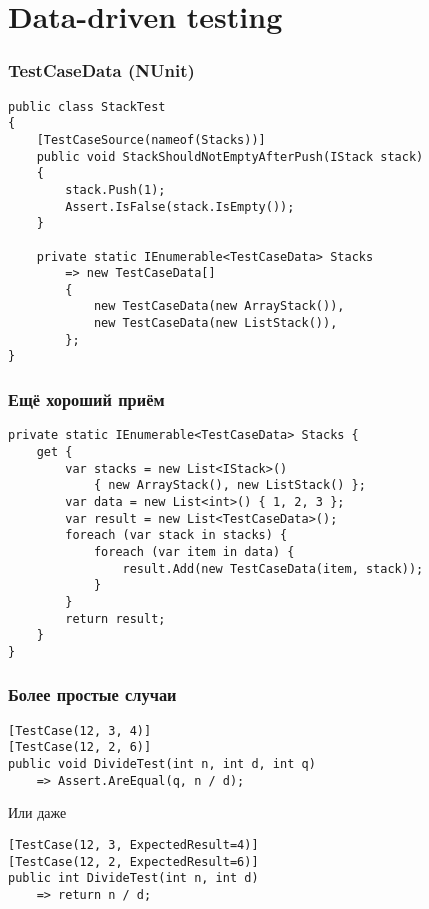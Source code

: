 \documentclass{../../slides-style}
\begin{document}
    \begin{frame}[plain]
        \titlepage
    \end{frame}

    \section{Data-driven testing}

    \begin{frame}[fragile]
        \frametitle{TestCaseData (NUnit)}
        \begin{verbatim}
public class StackTest
{
    [TestCaseSource(nameof(Stacks))]
    public void StackShouldNotEmptyAfterPush(IStack stack)
    {
        stack.Push(1);
        Assert.IsFalse(stack.IsEmpty());
    }

    private static IEnumerable<TestCaseData> Stacks
        => new TestCaseData[]
        {
            new TestCaseData(new ArrayStack()),
            new TestCaseData(new ListStack()),
        };
}
        \end{verbatim}
    \end{frame}

    \begin{frame}[fragile]
        \frametitle{Ещё хороший приём}
        \begin{verbatim}
private static IEnumerable<TestCaseData> Stacks { 
    get {
        var stacks = new List<IStack>() 
            { new ArrayStack(), new ListStack() };
        var data = new List<int>() { 1, 2, 3 };
        var result = new List<TestCaseData>();
        foreach (var stack in stacks) {
            foreach (var item in data) {
                result.Add(new TestCaseData(item, stack));
            }
        }
        return result;
    }
}
        \end{verbatim}
    \end{frame}

    \begin{frame}[fragile]
        \frametitle{Более простые случаи}
        \begin{verbatim}
[TestCase(12, 3, 4)]
[TestCase(12, 2, 6)]
public void DivideTest(int n, int d, int q)
    => Assert.AreEqual(q, n / d);
        \end{verbatim}
        \vspace{3mm}
        Или даже
        \begin{verbatim}
[TestCase(12, 3, ExpectedResult=4)]
[TestCase(12, 2, ExpectedResult=6)]
public int DivideTest(int n, int d)
    => return n / d;
        \end{verbatim}
    \end{frame}
\end{document}
